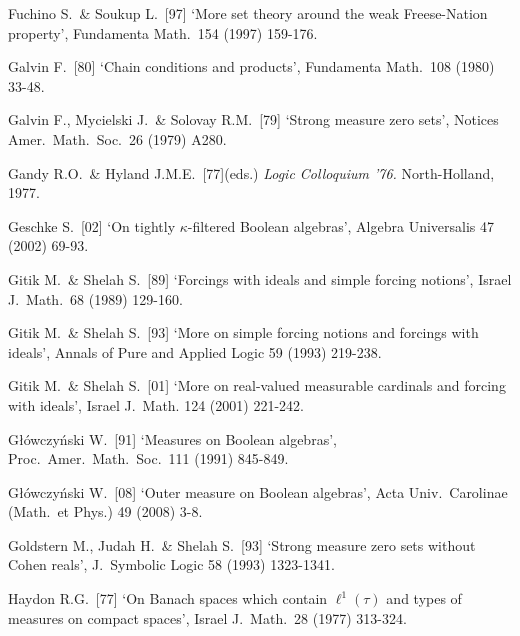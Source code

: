 {Fuchino S.\ \& Soukup L.\ [97] `More set theory around the weak
Freese-Nation property', Fundamenta Math.\ 154 (1997) 159-176.
\cmmnt{[518I, 518K.]}

\medskip%

Galvin F.\ [80] `Chain conditions and products',
Fundamenta Math.\ 108 (1980) 33-48.
\cmmnt{[\S553 {\it notes\/}.]}

Galvin F., Mycielski J.\ \& Solovay R.M.\ [79] `Strong measure zero sets',
Notices Amer.\ Math.\ Soc.\ 26 (1979) A280.
\cmmnt{[534H.]}

Gandy R.O.\ \& Hyland J.M.E.\ [77](eds.) {\it Logic Colloquium '76.}
North-Holland, 1977.

Geschke S.\ [02] `On tightly $\kappa$-filtered Boolean algebras',
Algebra Universalis 47 (2002) 69-93.
\cmmnt{[518P, 518S, \S535 {\it notes\/}.]}

Gitik M.\ \& Shelah S.\ [89] `Forcings with ideals and
simple forcing notions', Israel J.\ Math.\ 68 (1989) 129-160.
\cmmnt{[543E, 546G.]}

Gitik M.\ \& Shelah S.\
[93] `More on simple forcing notions and forcings with
ideals', Annals of Pure and Applied Logic 59 (1993) 219-238.
\cmmnt{[542E, 543E, 546G.]}

Gitik M.\ \& Shelah S.\ [01]
`More on real-valued measurable cardinals and forcing with ideals',
Israel J.\ Math. 124 (2001) 221-242.
\cmmnt{[546J, \S547 {\it intro.}]}

G\l\'owczy\'nski W.\ [91] `Measures on Boolean algebras',
Proc.\ Amer.\ Math.\ Soc.\ 111 (1991) 845-849.
\cmmnt{[555K.]}

G\l\'owczy\'nski W.\ [08] `Outer measure on Boolean algebras', Acta Univ.\
Carolinae (Math.\ et Phys.) 49 (2008) 3-8.
\cmmnt{[555K.]}

Goldstern M., Judah H.\ \& Shelah S.\ [93] `Strong measure zero sets
without Cohen reals',
J.\ Symbolic Logic 58 (1993) 1323-1341.
\cmmnt{[\S534 {\it notes\/}.]}

\medskip%


Haydon R.G.\ [77] `On Banach spaces which contain $\ell^1(\tau)$ and
types of measures on compact spaces', Israel J.\ Math.\ 28 (1977) 313-324.
\cmmnt{[531E, 531L.]}


}
